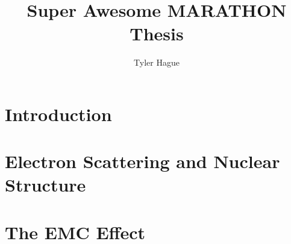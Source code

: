 \documentclass[11pt]{ksudiss}                          %
\title{Super Awesome MARATHON Thesis}         %
\author{Tyler Hague}
\begin{document}

\begin{abstract}
  
\end{abstract}


\makefrontmatter




\begin{acknowledgments}
  
\end{acknowledgments}


\mainmatter

\chapter{\bf{Introduction}}
\setcounter{figure}{0}
\setcounter{table}{0}
\setcounter{equation}{0}


\chapter{\bf{Electron Scattering and Nuclear Structure}}             %
\setcounter{figure}{0}
\setcounter{table}{0}
\setcounter{equation}{0}


\chapter{\bf{The EMC Effect}}             %
\setcounter{figure}{0}
\setcounter{table}{0}
\setcounter{equation}{0}

\end{document}
